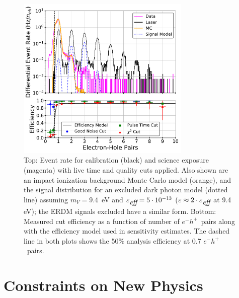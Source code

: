 \documentclass[%
reprint,
superscriptaddress,
preprintnumbers,
amsmath,amssymb,
prl,
aps,
floatfix
]{revtex4-1}
\newcommand{\eh}{$e^-h^+$}
\begin{document}
\begin{figure}
\includegraphics[width=3.25in]{Spectrum.pdf}
\caption{Top: Event rate for calibration (black) and science exposure (magenta) with live time and quality cuts applied. Also shown are an impact ionization background Monte Carlo model (orange), and the signal distribution for an excluded dark photon model (dotted line) assuming $m_{V} =9.4$~eV and $\varepsilon_{\mbox{\it eff}}=5\cdot 10^{-13}$ ($\varepsilon\approx2\cdot\varepsilon_{\mbox{\it eff}}$ at 9.4 eV); the ERDM signals excluded have a similar form. Bottom: Measured cut efficiency as a function of number of \eh\ pairs along with the efficiency model used in sensitivity estimates. The dashed line in both plots shows the 50\% analysis efficiency at 0.7 \eh\ pairs.}\label{fig:data}
\end{figure}

\section{Constraints on New Physics}
\end{document}
